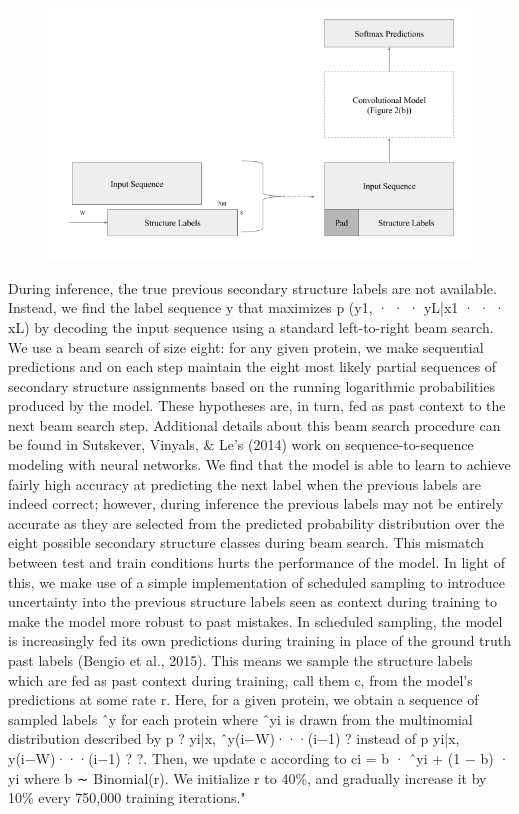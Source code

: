 \documentclass[]{scrartcl}
\begin{document}
\begin{figure}
	\centering
	\includegraphics[width=0.8\linewidth]{conditioning}
	\label{fig:conditioning}
\end{figure}
During inference, the true previous secondary structure labels are not available. Instead, we find the label sequence y that maximizes p (y1, · · · yL|x1 · · · xL) by decoding the input sequence using a standard left-to-right beam search. We use a beam search of size eight: for any given protein, we make sequential predictions and on each step maintain the eight most likely partial sequences of secondary structure assignments based on the running logarithmic probabilities produced by the model. These hypotheses are, in turn, fed as past context to the next beam search step. Additional details about this beam search procedure can be found in Sutskever, Vinyals, \& Le’s (2014) work on sequence-to-sequence modeling with neural networks.
We find that the model is able to learn to achieve fairly high accuracy at predicting the next label when the previous labels are indeed correct; however, during inference the previous labels may not be entirely accurate as they are selected from the predicted probability distribution over the eight possible secondary structure classes during beam search. This mismatch between test and train conditions hurts the performance of the model. In light of this, we make use of a simple implementation of scheduled sampling to introduce uncertainty into the previous structure labels seen as context during training to make the model more robust to past mistakes. In scheduled sampling, the model is increasingly fed its own predictions during training in place of the ground truth past labels (Bengio et al., 2015). This means we sample the structure labels which are fed as past context during training, call them c, from the model’s predictions at some rate r. Here, for a given protein, we obtain a sequence of sampled labels ˆy for each protein where ˆyi is drawn from the multinomial distribution described by p ? yi|x, ˆy(i−W)···(i−1) ? instead of p yi|x, y(i−W)···(i−1) ? ?. Then, we update c according to
ci = b · ˆyi + (1 − b) · yi where b ∼ Binomial(r). We initialize r to 40\%, and gradually increase it by 10\% every 750,000 training iterations." \cite{Busia2017}
\end{document}
